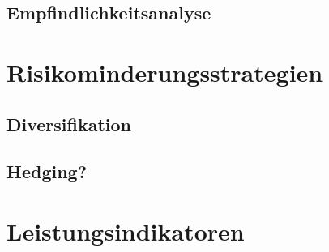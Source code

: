        \subsection{Empfindlichkeitsanalyse}

    \section{Risikominderungsstrategien}

        \subsection{Diversifikation}

        \subsection{Hedging?}

    \section{Leistungsindikatoren}
